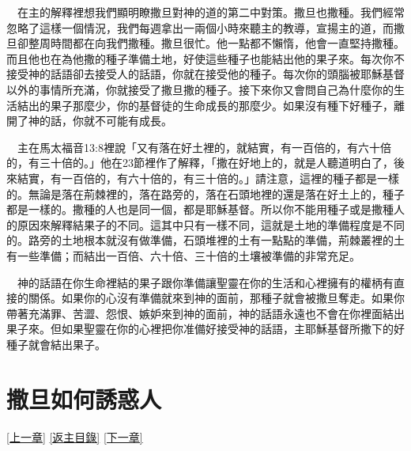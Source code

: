 \documentclass{book}
\begin{document}
　在主的解釋裡想我們顯明瞭撒旦對神的道的第二中對策。撒旦也撒種。我們經常忽略了這樣一個情況，我們每週拿出一兩個小時來聽主的教導，宣揚主的道，而撒旦卻整周時間都在向我們撒種。撒旦很忙。他一點都不懶惰，他會一直堅持撒種。而且他也在為他撒的種子準備土地，好使這些種子也能結出他的果子來。每次你不接受神的話語卻去接受人的話語，你就在接受他的種子。每次你的頭腦被耶穌基督以外的事情所充滿，你就接受了撒旦撒的種子。接下來你又會問自己為什麼你的生活結出的果子那麼少，你的基督徒的生命成長的那麼少。如果沒有種下好種子，離開了神的話，你就不可能有成長。

　主在馬太福音13:8裡說「又有落在好土裡的，就結實，有一百倍的，有六十倍的，有三十倍的。」他在23節裡作了解釋，「撒在好地上的，就是人聽道明白了，後來結實，有一百倍的，有六十倍的，有三十倍的。」請注意，這裡的種子都是一樣的。無論是落在荊棘裡的，落在路旁的，落在石頭地裡的還是落在好土上的，種子都是一樣的。撒種的人也是同一個，都是耶穌基督。所以你不能用種子或是撒種人的原因來解釋結果子的不同。這其中只有一樣不同，這就是土地的準備程度是不同的。路旁的土地根本就沒有做準備，石頭堆裡的土有一點點的準備，荊棘叢裡的土有一些準備；而結出一百倍、六十倍、三十倍的土壤被準備的非常充足。

　神的話語在你生命裡結的果子跟你準備讓聖靈在你的生活和心裡擁有的權柄有直接的關係。如果你的心沒有準備就來到神的面前，那種子就會被撒旦奪走。如果你帶著充滿罪、苦澀、怨恨、嫉妒來到神的面前，神的話語永遠也不會在你裡面結出果子來。但如果聖靈在你的心裡把你准備好接受神的話語，主耶穌基督所撒下的好種子就會結出果子。

\chapter{撒旦如何誘惑人}
\label{sec:ch13}
\hyperref[sec:ch12]{[上一章]}
\hyperlink{toc}{[返主目錄]}
\hyperref[sec:ch14]{[下一章]}

\begin{center}
\noindent{}
\end{center}
\end{document}
